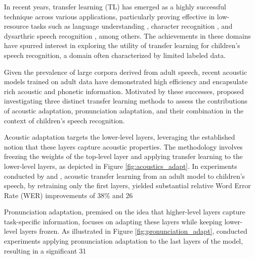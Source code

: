 In recent years, transfer learning (TL) has emerged as a highly successful technique across various applications, particularly proving effective in low-resource tasks such as language understanding \cite{Bert}, character recognition \cite{tfcharacter}, and dysarthric speech recognition \cite{tfpathology}, among others. The achievements in these domains have spurred interest in exploring the utility of transfer learning for children's speech recognition, a domain often characterized by limited labeled data.

Given the prevalence of large corpora derived from adult speech, recent acoustic models trained on adult data have demonstrated high efficiency and encapsulate rich acoustic and phonetic information. Motivated by these successes, \cite{TFchildren} proposed investigating three distinct transfer learning methods to assess the contributions of acoustic adaptation, pronunciation adaptation, and their combination in the context of children's speech recognition.

Acoustic adaptation targets the lower-level layers, leveraging the established notion that these layers capture acoustic properties. The methodology involves freezing the weights of the top-level layer and applying transfer learning to the lower-level layers, as depicted in Figure \ref{fig:acoustics_adapt}. In experiments conducted by \cite{TFchildren} and \cite{TransferLF}, acoustic transfer learning from an adult model to children's speech, by retraining only the first layers, yielded substantial relative Word Error Rate (WER) improvements of 38\% and 26%

Pronunciation adaptation, premised on the idea that higher-level layers capture task-specific information, focuses on adapting these layers while keeping lower-level layers frozen. As illustrated in Figure \ref{fig:pronunciation_adapt}, \cite{TFchildren} conducted experiments applying pronunciation adaptation to the last layers of the model, resulting in a significant 31%

